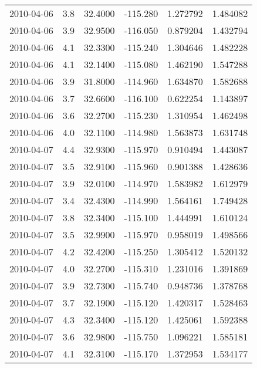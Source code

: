 \begin{tabular}{lrrrrr}
2010-04-06 &       3.8 &  32.4000 &  -115.280 &         1.272792 &         1.484082 \\
2010-04-06 &       3.9 &  32.9500 &  -116.050 &         0.879204 &         1.432794 \\
2010-04-06 &       4.1 &  32.3300 &  -115.240 &         1.304646 &         1.482228 \\
2010-04-06 &       4.1 &  32.1400 &  -115.080 &         1.462190 &         1.547288 \\
2010-04-06 &       3.9 &  31.8000 &  -114.960 &         1.634870 &         1.582688 \\
2010-04-06 &       3.7 &  32.6600 &  -116.100 &         0.622254 &         1.143897 \\
2010-04-06 &       3.6 &  32.2700 &  -115.230 &         1.310954 &         1.462498 \\
2010-04-06 &       4.0 &  32.1100 &  -114.980 &         1.563873 &         1.631748 \\
2010-04-07 &       4.4 &  32.9300 &  -115.970 &         0.910494 &         1.443087 \\
2010-04-07 &       3.5 &  32.9100 &  -115.960 &         0.901388 &         1.428636 \\
2010-04-07 &       3.9 &  32.0100 &  -114.970 &         1.583982 &         1.612979 \\
2010-04-07 &       3.4 &  32.4300 &  -114.990 &         1.564161 &         1.749428 \\
2010-04-07 &       3.8 &  32.3400 &  -115.100 &         1.444991 &         1.610124 \\
2010-04-07 &       3.5 &  32.9900 &  -115.970 &         0.958019 &         1.498566 \\
2010-04-07 &       4.2 &  32.4200 &  -115.250 &         1.305412 &         1.520132 \\
2010-04-07 &       4.0 &  32.2700 &  -115.310 &         1.231016 &         1.391869 \\
2010-04-07 &       3.9 &  32.7300 &  -115.740 &         0.948736 &         1.378768 \\
2010-04-07 &       3.7 &  32.1900 &  -115.120 &         1.420317 &         1.528463 \\
2010-04-07 &       4.3 &  32.3400 &  -115.120 &         1.425061 &         1.592388 \\
2010-04-07 &       3.6 &  32.9800 &  -115.750 &         1.096221 &         1.585181 \\
2010-04-07 &       4.1 &  32.3100 &  -115.170 &         1.372953 &         1.534177 \\

\end{tabular}
